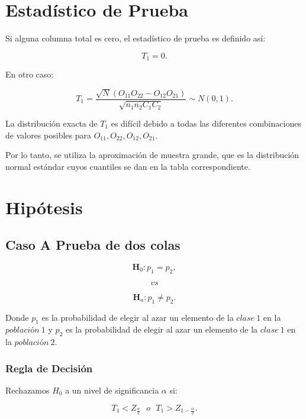 \documentclass[
  a4paper,
  oneside,
  openany]{book}
\begin{document}
\hypertarget{estaduxedstico-de-prueba-9}{%
\section{Estadístico de Prueba}\label{estaduxedstico-de-prueba-9}}

Si alguna columna total es cero, el estadístico de prueba es definido así:

\[T_{1}=0.\]

En otro caso:

\[T_{1}=\frac{\sqrt{N}(O_{11}O_{22}-O_{12}O_{21})}{\sqrt{n_{1}n_{2}C_{1}C_{2}}}\sim N(0,1).\]

La distribución exacta de \(T_1\) es difícil debido a todas las diferentes combinaciones de valores posibles para \(O_{11},O_{22},O_{12},O_{21}\).

Por lo tanto, se utiliza la aproximación de muestra grande, que es la distribución normal estándar cuyos cuantiles se dan en la tabla correspondiente.

\hypertarget{hipuxf3tesis-8}{%
\section{Hipótesis}\label{hipuxf3tesis-8}}

\hypertarget{caso-a-prueba-de-dos-colas-7}{%
\subsection*{Caso A Prueba de dos colas}\label{caso-a-prueba-de-dos-colas-7}}


\[\textbf{H}_0: p_{1} = p_{2},\]

\[vs\]

\[\textbf{H}_a: p_{1} \neq p_{2}.\]

Donde \(p_{1}\) es la probabilidad de elegir al azar un elemento de la \(clase\ 1\) en la \(población\ 1\) y \(p_{2}\) es la probabilidad de elegir al azar un elemento de la \(clase\ 1\) en la \(población\ 2\).

\hypertarget{regla-de-decisiuxf3n-21}{%
\subsubsection*{Regla de Decisión}\label{regla-de-decisiuxf3n-21}}


Rechazamos \(H_0\) a un nivel de significancia \(\alpha\) si:

\[T_{1}< Z_\frac{\alpha}{2} \ \ \    o  \ \ \  T_{1} > Z_{1-\frac{\alpha}{2}}.\]
\end{document}
